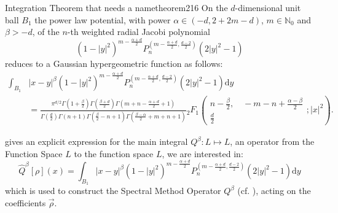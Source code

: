 \begin{theorem}{Integration Theorem that needs a name}{theorem216}
  On the $d$-dimensional unit ball $B_1$ the power law potential, with power $\alpha \in(-d,2+2m-d)$, $m\in\mathbb{N}_0$ and $\beta>-d$, of the $n$-th weighted radial Jacobi polynomial $$(1-|y|^2)^{m-\frac{\alpha+d}{2}}P_n^{\left(m-\frac{\alpha+d}{2},\frac{d-2}{2}\right)}(2|y|^2-1)$$ reduces to a Gaussian hypergeometric function as follows:
  \begin{align*}
    \int_{B_1} & |x-y|^\beta (1-|y|^2)^{m-\frac{\alpha+d}{2}} P_n^{\left(m-\frac{\alpha+d}{2},\frac{d-2}{2}\right)}(2|y|^2-1) \mathrm{d}y                                                                                                                                                                                                                                                                                    \\
               & = \tfrac{\pi ^{d/2} \Gamma \left(1+\frac{\beta}{2}\right) \Gamma \left(\frac{\beta+d}{2}\right) \Gamma \left(m+n-\frac{\alpha+d}{2}+1\right)}{\Gamma \left(\frac{d}{2}\right) \Gamma (n+1) \Gamma \left(\frac{\beta}{2}-n+1\right) \Gamma \left(\frac{\beta-\alpha}{2}+m+n+1\right)}{}_2F_1\left(\begin{matrix}n-\frac{\beta}{2}, \quad -m-n+\frac{\alpha-\beta}{2} \\\frac{d}{2}\end{matrix};|x|^2\right).
  \end{align*}
\end{theorem}

 gives an explicit expression for the main integral
\(Q^{\beta}: L \mapsto L\), an operator from the Function Space \(L\) to the function space \(L\), we are interested in:
$$\hat{Q}^{\beta}[\rho](x) = \int_{B_1} |x-y|^\beta (1-|y|^2)^{m-\frac{\alpha+d}{2}} P_n^{(m-
  \frac{\alpha+d}{2},\frac{d-2}{2})}(2|y|^2-1) \mathrm{d}y$$ which is used
to construct the Spectral Method Operator \(Q^\beta\) (cf. ), acting on the coefficients \(\vec{\rho}\).
